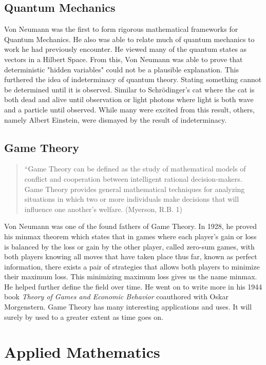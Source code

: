 \documentclass[12pt]{article}
\begin{document}
\subsection*{Quantum Mechanics}
 	Von Neumann was the first to form rigorous mathematical frameworks for Quantum Mechanics. He also was able to relate much of quantum mechanics to work he had previously encounter. He viewed many of the quantum states as vectors in a Hilbert Space. From this, Von Neumann was able to prove that deterministic "hidden variables" could not be a plausible explanation. This furthered the idea of indeterminacy of quantum theory. Stating something cannot be determined until it is observed. Similar to Schrödinger's cat where the cat is both dead and alive until observation or light photons where light is both wave and a particle until observed. While many were excited from this result, others, namely Albert Einstein, were dismayed by the result of indeterminacy.
\subsection*{Game Theory}
	\begin{quotation}
				``Game Theory can be defined as the study of mathematical models of
		conflict and cooperation between intelligent rational decision-makers.
		Game Theory provides general mathematical techniques for analyzing
		situations in which two or more individuals make decisions that will
		influence one another's welfare. (Myerson, R.B. 1)
	\end{quotation}

	
	Von Neumann was one of the found fathers of Game Theory. In 1928, he proved his minmax theorem which states that in games where each player's gain or loss is balanced by the loss or gain by the other player, called zero-sum games, with both players knowing all moves that have taken place thus far, known as perfect information, there exists a pair of strategies that allows both players to minimize their maximum loss. This minimizing maximum loss gives us the name minmax. He helped further define the field over time. He went on to write more in his 1944 book \textit{Theory of Games and Economic Behavior} coauthored with Oskar Morgenstern. Game Theory has many interesting applications and uses. It will surely by used to a greater extent as time goes on.
\section*{Applied Mathematics}
\end{document}
